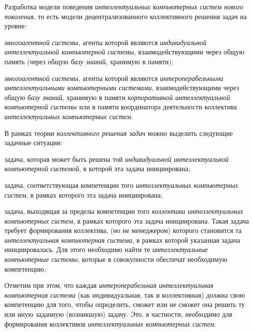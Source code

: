 \begin{textitemize}
	\medskip
	\item Разработка модели  поведения \textit{интеллектуальных компьютерных систем нового поколения}, то есть модели децентрализованного коллективного решения задач на уровне:
	\begin{textitemize}
		\item \textit{многоагентной системы}, агенты которой являются  \textit{индивидуальной интеллектуальной компьютерной системы}, взаимодействующими через общую память (через общую \textit{базу знаний}, хранимую в  памяти);
		\item \textit{многоагентной системы}, агенты которой являются \textit{интероперабельными интеллектуальными компьютерными системами}, взаимодействующими через общую \textit{базу знаний}, хранимую в памяти \textit{корпоративной интеллектуальной компьютерной системы} или в памяти координатора деятельности  коллектива \textit{интеллектуальных компьютерных систем}. 
	\end{textitemize}
	В рамках теории \textit{коллективного решения задач} можно выделить следующие задачные ситуации:
	\begin{textitemize}
		\item задача, которая может быть решена той \textit{индивидуальной интеллектуальной компьютерной системой}, в которой эта задача инициирована;
		\item задача, соответствующая компетенции того \textit{ интеллектуальных компьютерных систем}, в рамках которого эта задача инициирована;
		\item задача, выходящая за пределы компетенции того \textit{коллектива интеллектуальных компьютерных систем}, в рамках которого эта задача инициирована. Такая задача требует формирования  коллектива,  (но не менеджером) которого становится та \textit{интеллектуальная компьютерная система}, в рамках которой указанная задача инициировалась. Для этого необходимо найти те \textit{интеллектуальные компьютерные системы}, которые в совокупности обеспечат необходимую компетенцию.
	\end{textitemize}
	Отметим при этом, что каждая \textit{интероперабельная интеллектуальная компьютерная система} (как индивидуальная, так и коллективная) должна  свою компетенцию для того, чтобы определить, сможет или не сможет она решить ту или иную заданную (возникшую) задачу. Это, в частности, необходимо для формирования  коллективов \textit{интеллектуальных компьютерных систем}.

\end{textitemize}
